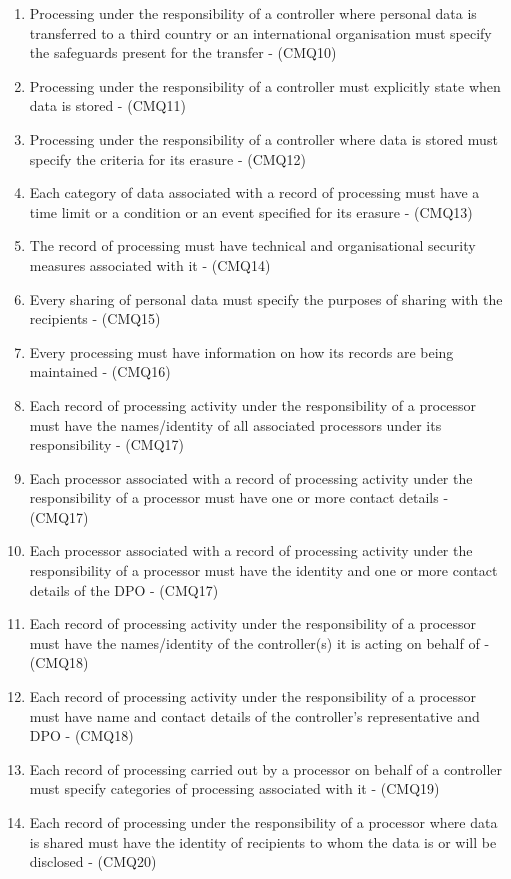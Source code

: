 \begin{enumerate}[label={\textit{C.\theenumi}}]
    \item Processing under the responsibility of a controller where personal data is transferred to a third country or an international organisation must specify the safeguards present for the transfer - (CMQ10)
    \item Processing under the responsibility of a controller must explicitly state when data is stored - (CMQ11)
    \item Processing under the responsibility of a controller where data is stored must specify the criteria for its erasure - (CMQ12)
    \item Each category of data associated with a record of processing must have a time limit or a condition or an event specified for its erasure - (CMQ13)
    \item The record of processing must have technical and organisational security measures associated with it - (CMQ14)
    \item Every sharing of personal data must specify the purposes of sharing with the recipients - (CMQ15)
    \item Every processing must have information on how its records are being maintained - (CMQ16)
    \item Each record of processing activity under the responsibility of a processor must have the names/identity of all associated processors under its responsibility - (CMQ17)
    \item Each processor associated with a record of processing activity under the responsibility of a processor must have one or more contact details - (CMQ17)
    \item Each processor associated with a record of processing activity under the responsibility of a processor must have the identity and one or more contact details of the DPO - (CMQ17)
    \item Each record of processing activity under the responsibility of a processor must have the names/identity of the controller(s) it is acting on behalf of - (CMQ18)
    \item Each record of processing activity under the responsibility of a processor must have name and contact details of the controller's representative and DPO - (CMQ18)
    \item Each record of processing carried out by a processor on behalf of a controller must specify categories of processing associated with it - (CMQ19)
    \item Each record of processing under the responsibility of a processor where data is shared must have the identity of recipients to whom the data is or will be disclosed - (CMQ20)

\end{enumerate}
